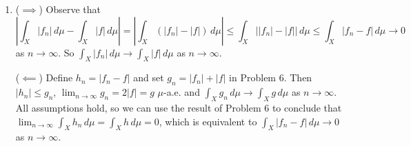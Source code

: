 \documentclass[12pt]{report}
\newcommand{\numl}[1]{\item[\large\textbf{\sffamily #1.}]}
\newcommand{\abs}[1]{\left| #1 \right|}
\newcommand{\paren}[1]{\left( #1 \right)}
\newcommand{\ra}{\rightarrow}
\newcommand{\mimp}{\(\implies\)}
\newcommand{\mimpd}{\(\impliedby\)}
\renewcommand{\d}[1]{\,d{#1}}
\begin{document}
\begin{enumerate}
    \numl{7} (\mimp) Observe that
    \[
        \abs{\int_X \abs{f_n} \d{\mu} - \int_X \abs{f} \d{\mu}} = \abs{\int_X \paren{\abs{f_n} - \abs{f}} \d{\mu}} \leq \int_X \abs{\abs{f_n} - \abs{f}} \d{\mu} \leq \int_X \abs{f_n - f}\d{\mu} \ra 0
    \]
    as \(n \ra \infty\). So \(\int_X \abs{f_n} \d{\mu} \ra \int_X \abs{f} \d{\mu}\) as \(n \ra \infty\).

    (\mimpd) Define \(h_n = \abs{f_n - f}\) and set \(g_n = \abs{f_n} + \abs{f}\) in {\sffamily Problem 6}. Then \(\abs{h_n}\leq g_n\), \(\lim_{n \ra \infty} g_n = 2\abs{f} = g\) \(\mu\)-a.e. and \(\int_X g_n \d{\mu} \ra \int_X g \d{\mu}\) as \(n \ra \infty\). All assumptions hold, so we can use the result of {\sffamily Problem 6} to conclude that \(\lim_{n \ra \infty} \int_X h_n \d{\mu} = \int_X h \d{\mu} = 0\), which is equivalent to \(\int_X \abs{f_n - f} \d{\mu} \ra 0\) as \(n \ra \infty\).

\end{enumerate}
\end{document}
